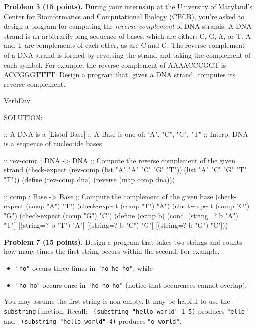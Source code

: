 \documentclass[12pt]{article}
\begin{document}



\newpage
\noindent
{\bf Problem 6 (15 points).}  
%
During your internship at the University of Maryland's Center for
Bioinformatics and Computational Biology (CBCB), you're asked to
design a program for computing the \emph{reverse complement} of DNA strands.
%
A DNA strand is an arbitrarily long sequence of bases, which are
either: C, G, A, or T.  A and T are complements of each other, as are
C and G.  The reverse complement of a DNA strand is formed by
reversing the strand and taking the complement of each symbol.  For
example, the reverse complement of AAAACCCGGT is ACCGGGTTTT.
%
Design a program that, given a DNA strand, computes its reverse complement.



\begin{SaveVerbatim}{VerbEnv}


SOLUTION:

;; A DNA is a [Listof Base]
;; A Base is one of: "A", "C", "G", "T"
;; Interp: DNA is a sequence of nucleotide bases

;; rev-comp : DNA -> DNA
;; Compute the reverse complement of the given strand
(check-expect (rev-comp (list "A" "A" "C" "G" "T"))
              (list "A" "C" "G" "T" "T"))
(define (rev-comp dna)
  (reverse (map comp dna)))

;; comp : Base -> Base
;; Compute the complement of the given base
(check-expect (comp "A") "T")
(check-expect (comp "T") "A")
(check-expect (comp "C") "G")
(check-expect (comp "G") "C")
(define (comp b)
  (cond [(string=? b "A") "T"]
        [(string=? b "T") "A"]
        [(string=? b "C") "G"]
        [(string=? b "G") "C"]))
\end{SaveVerbatim}




\newpage


\noindent
{\bf Problem 7 (15 points).} Design a program that takes two
strings and counts how many times the first string occurs within the
second.
For example,
\begin{itemize}
\item {\tt "ho"} occurs three times in {\tt "ho ho ho"}, while
\item {\tt "ho ho"} occurs once in {\tt "ho ho ho"} (notice that occurences
  cannot overlap).
\end{itemize}
You may assume the first string is non-empty.
%
It may be helpful to use the {\tt substring} function.  Recall: {\tt
  (substring "hello world" 1 5)} produces {\tt "ello"} and {\tt
  (substring "hello world" 4)} produces {\tt "o world"}.
\end{document}
